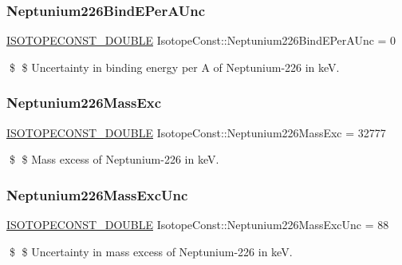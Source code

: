 \subsubsection{\texorpdfstring{Neptunium226\+Bind\+E\+Per\+A\+Unc}{Neptunium226BindEPerAUnc}}
{\footnotesize\ttfamily \mbox{\hyperlink{group___isotope_const-_macros_ga8f45a7272ce02c0b4c65c44636ed719a}{I\+S\+O\+T\+O\+P\+E\+C\+O\+N\+S\+T\+\_\+\+D\+O\+U\+B\+LE}} Isotope\+Const\+::\+Neptunium226\+Bind\+E\+Per\+A\+Unc = 0}

\$ \$ Uncertainty in binding energy per A of Neptunium-\/226 in keV. \mbox{\label{group___isotope_const-_neptunium-_np226_gaa128b05dd53a5f10e3984afd92df7c73}} 
\subsubsection{\texorpdfstring{Neptunium226\+Mass\+Exc}{Neptunium226MassExc}}
{\footnotesize\ttfamily \mbox{\hyperlink{group___isotope_const-_macros_ga8f45a7272ce02c0b4c65c44636ed719a}{I\+S\+O\+T\+O\+P\+E\+C\+O\+N\+S\+T\+\_\+\+D\+O\+U\+B\+LE}} Isotope\+Const\+::\+Neptunium226\+Mass\+Exc = 32777}

\$ \$ Mass excess of Neptunium-\/226 in keV. \mbox{\label{group___isotope_const-_neptunium-_np226_ga36b4f1c713d7f2debe0402a0fff45648}} 
\subsubsection{\texorpdfstring{Neptunium226\+Mass\+Exc\+Unc}{Neptunium226MassExcUnc}}
{\footnotesize\ttfamily \mbox{\hyperlink{group___isotope_const-_macros_ga8f45a7272ce02c0b4c65c44636ed719a}{I\+S\+O\+T\+O\+P\+E\+C\+O\+N\+S\+T\+\_\+\+D\+O\+U\+B\+LE}} Isotope\+Const\+::\+Neptunium226\+Mass\+Exc\+Unc = 88}

\$ \$ Uncertainty in mass excess of Neptunium-\/226 in keV. \mbox{\label{group___isotope_const-_neptunium-_np226_gad4b68d6cac86fb47936cca0402c589c8}} 
